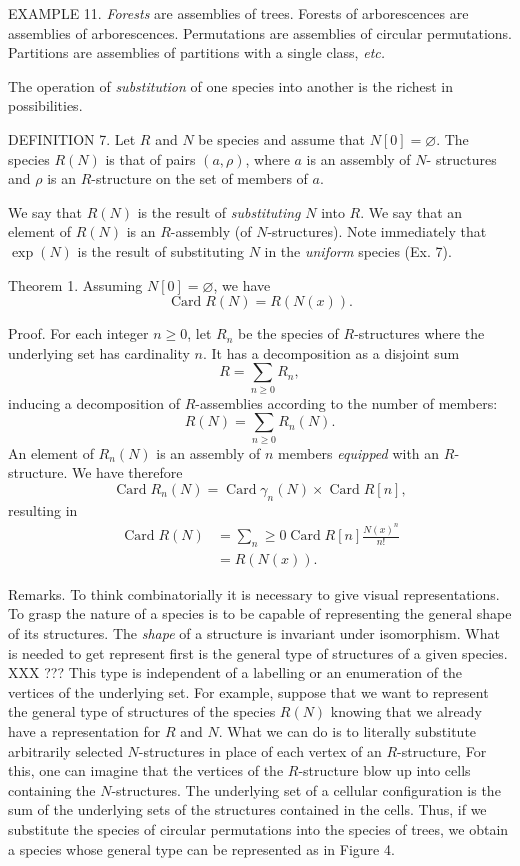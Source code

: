 \documentclass{article}
\theoremstyle{definition}
\theoremstyle{remark}
\DeclareMathOperator{\Card}{Card}
\newcommand{\term}[1]{\emph{#1}}
\newcommand{\etc}{\textit{etc.}\xspace}
\begin{document}
EXAMPLE 11. \term{Forests} are assemblies of trees. Forests of
arborescences are assemblies of arborescences. Permutations are
assemblies of circular permutations. Partitions are assemblies of
partitions with a single class, \etc

The operation of \term{substitution} of one species into another is
the richest in possibilities.

DEFINITION 7. Let $R$ and $N$ be species and assume that $N [0] = \varnothing$.
The species $R (N)$ is that of pairs $(a, \rho)$, where $a$ is an assembly of $N$-
structures and $\rho$ is an $R$-structure on the set of members of $a$.

We say that $R (N)$ is the result of \term{substituting} $N$ into $R$. We
say that an element of $R (N)$ is an $R$-assembly (of $N$-structures). Note
immediately that $\exp (N)$ is the result of substituting $N$ in
the \emph{uniform} species (Ex. 7).

Theorem 1. Assuming $N [0] = \varnothing$, we have
\[ \Card R (N) = R (N (x)). \]

Proof. For each integer $n \geq 0$, let $R_n$ be the species of $R$-structures
where the underlying set has cardinality $n$. It has a decomposition
as a disjoint sum
\[ R = \sum_{n \geq 0} R_n, \]
inducing a decomposition of $R$-assemblies according to the number of
members:
\[ R (N) = \sum_{n \geq 0} R_n(N). \]
An element of $R_n(N)$ is an assembly of $n$ members \emph{equipped} with an $R$-structure.
We have therefore
\[ \Card R_n(N) = \Card \gamma_n(N) \times \Card R [n], \]
resulting in
\begin{align*} \Card R(N) &= \sum_n \geq 0 \Card R[n]
  \frac{N(x)^n}{n!} \\
  &= R(N(x)).
\end{align*}


Remarks. To think combinatorially it is necessary
to give visual representations. To grasp the nature of a species is to be
capable of representing the general shape of its structures. The \emph{shape} of a
structure is invariant under isomorphism. What is needed to get
represent first is the general type of structures of a given species. XXX ???
This type is independent of a labelling or an enumeration of the vertices
of the underlying set. For example, suppose that we want to
represent the general type of structures of the species $R(N)$ knowing that we
already have a representation for $R$ and $N$. What we can do is to literally
substitute arbitrarily selected $N$-structures in place of each vertex of an $R$-structure,
For this, one can imagine that
the vertices of the $R$-structure blow up into cells containing the $N$-structures.
The underlying set of a cellular configuration is the sum of
the underlying sets of the structures contained in the cells. Thus, if we
substitute the species of circular permutations into the species of trees, we
obtain a species whose general type can be represented as in
Figure 4.
\end{document}
